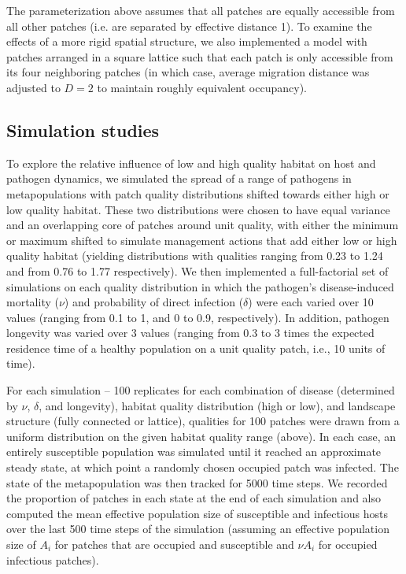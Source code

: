 \documentclass{article}
\begin{document}
The parameterization above assumes that all patches are equally accessible from all other patches (i.e. are separated by effective distance 1).  To examine the effects of a more rigid spatial structure, we also implemented a model with patches arranged in a square lattice such that each patch is only accessible from its four neighboring patches (in which case, average migration distance was adjusted to $D = 2$ to maintain roughly equivalent occupancy).  

\subsection{Simulation studies}

To explore the relative influence of low and high quality habitat on host and pathogen dynamics, we simulated the spread of a range of pathogens in metapopulations with patch quality distributions shifted towards either high or low quality habitat.
These two distributions were chosen to have equal variance and an overlapping core of patches around unit quality, with either the minimum or maximum shifted to simulate management actions that add either low or high quality habitat (yielding distributions with qualities ranging from 0.23 to 1.24 and from 0.76 to 1.77 respectively).  
We then implemented a full-factorial set of simulations on each quality distribution in which the pathogen's disease-induced mortality ($\nu$) and probability of direct infection ($\delta$) were each varied over 10 values (ranging from 0.1 to 1, and 0 to 0.9, respectively).  In addition, pathogen longevity was varied over 3 values (ranging from 0.3 to 3 times the expected residence time of a healthy population on a unit quality patch, i.e., 10 units of time).

For each simulation -- 100 replicates for each combination of disease (determined by $\nu$, $\delta$, and longevity), habitat quality distribution (high or low), and landscape structure (fully connected or lattice), qualities for 100 patches were drawn from a uniform distribution on the given habitat quality range (above). In each case, an entirely susceptible population was simulated until it reached an approximate steady state, at which point a randomly chosen occupied patch was infected.  The state of the metapopulation was then tracked for 5000 time steps.  We recorded the proportion of patches in each state at the end of each simulation and also computed the mean effective population size of susceptible and infectious hosts over the last 500 time steps of the simulation (assuming an effective population size of $A_i$ for patches that are occupied and susceptible and $\nu A_i$ for occupied infectious patches).    
\end{document}
